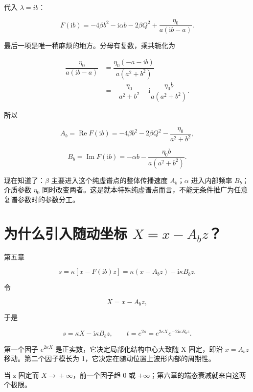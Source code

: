 代入 $\lambda{}=ib$：\par

\[
F(\mathrm{i}b)
=-4\beta b^2-\mathrm{i}\alpha b-2\beta Q^2
+\dfrac{\eta_0}{a(\mathrm{i}b-a)}.
\]

最后一项是唯一稍麻烦的地方。分母有复数，乘共轭化为\par

\[
\begin{aligned}
\dfrac{\eta_0}{a(\mathrm{i}b-a)}
&=\dfrac{\eta_0(-a-\mathrm{i}b)}
{a(a^2+b^2)}\\
&=-\dfrac{\eta_0}{a^2+b^2}
-\mathrm{i}\dfrac{\eta_0b}{a(a^2+b^2)}.
\end{aligned}
\]

所以\par

\[
A_b=\operatorname{Re}F(\mathrm{i}b)
=-4\beta b^2-2\beta Q^2-\dfrac{\eta_0}{a^2+b^2},
\]

\[
B_b=\operatorname{Im}F(\mathrm{i}b)
=-\alpha b-\dfrac{\eta_0b}{a(a^2+b^2)}.
\]

现在知道了：$\beta{}$ 主要进入这个纯虚谱点的整体传播速度 $A_b$；$\alpha{}$ 进入内部频率 $B_b$；介质参数 $\eta{}_{0}$ 同时改变两者。这是就本特殊纯虚谱点而言，不能无条件推广为任意复谱参数时的参数分工。\par

\section{为什么引入随动坐标 \texorpdfstring{$X=x-A_b z$}{X=x-Ab z}？}

第五章\par

\[
s=\kappa[x-F(\mathrm{i}b)z]
=\kappa(x-A_bz)-\mathrm{i}\kappa B_bz.
\]

令\par

\[
X=x-A_bz,
\]

于是\par

\[
s=\kappa X-\mathrm{i}\kappa B_bz,\qquad
t=e^{2s}=e^{2\kappa X}e^{-2\mathrm{i}\kappa B_bz}.
\]

第一个因子 $e^{2\kappa{}X}$ 是正实数，它决定局部化结构中心大致随 X 固定，即沿 $x=A_bz$ 移动。第二个因子模长为 1，它决定在随动位置上波形内部的周期性。\par

当 z 固定而 $X\to{}\pm{}\infty{}$，前一个因子趋 0 或 $+\infty{}$；第六章的端态衰减就来自这两个极限。\par

